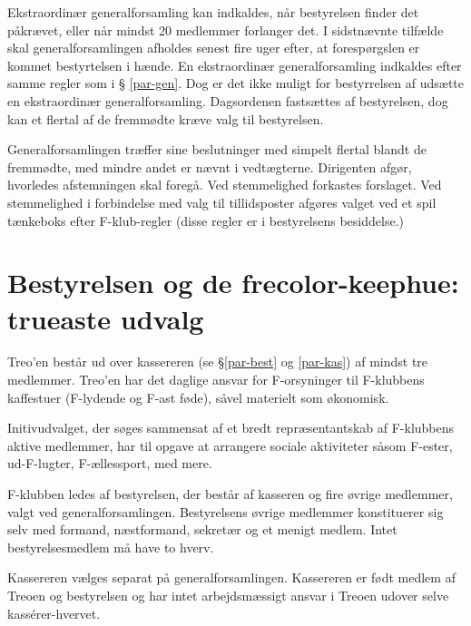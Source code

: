 \documentclass[a4paper,12pt,danish]{article}
\begin{document}
\begin{list}
\item Ekstraordinær generalforsamling kan indkaldes, når
  bestyrelsen finder det påkrævet, eller når mindst 20 medlemmer 
  forlanger det. I sidstnævnte tilfælde skal generalforsamlingen afholdes 
	senest fire uger efter, at forespørgslen er kommet bestyrtelsen i
	hænde.
  En ekstraordinær generalforsamling indkaldes efter samme regler som i \S
  \ref{par-gen}. Dog er det ikke muligt for bestyrrelsen af udsætte en ekstraordinær
  generalforsamling. Dagsordenen fastsættes af bestyrelsen, dog kan et flertal 
  af de fremmødte kræve valg til bestyrelsen. 
  
\item \label{gen-regler} Generalforsamlingen træffer sine beslutninger med 
  simpelt flertal blandt de fremmødte, med mindre andet er nævnt i vedtægterne.
  Dirigenten afgør, hvorledes afstemningen skal foregå.
  Ved stemmelighed forkastes forslaget. 
  Ved stemmelighed i forbindelse med valg til tillidsposter afgøres valget 
  ved et spil tænkeboks efter F-klub-regler (disse regler er i bestyrelsens besiddelse.)

\section{Bestyrelsen og de frecolor-keephue: trueaste udvalg}

\item Treo'en består ud over kassereren (se \S \ref{par-best} og
  \ref{par-kas}) af mindst tre medlemmer. Treo'en har det daglige
  ansvar for F-orsyninger til F-klubbens kaffestuer (F-lydende og F-ast føde),
  såvel materielt som økonomisk.
  
\item Initivudvalget, der søges sammensat af et bredt
  repræsentantskab af F-klubbens aktive medlemmer, har til opgave at
  arrangere sociale aktiviteter såsom F-ester, ud-F-lugter,
  F-ællessport, med mere.
  
\item \label{par-best} F-klubben ledes af bestyrelsen, der består
  af kasseren og fire øvrige medlemmer, valgt ved
  generalforsamlingen.  Bestyrelsens øvrige medlemmer konstituerer sig
  selv med formand, næstformand, sekretær og et menigt medlem. Intet
  bestyrelsesmedlem må have to hverv.

\item \label{par-kas} Kassereren vælges separat på
  generalforsamlingen.  Kassereren er født medlem af Treoen og
  bestyrelsen og har intet arbejdsmæssigt ansvar i Treoen udover
  selve kass\'{e}rer-hvervet.


\end{list}
\end{document}

